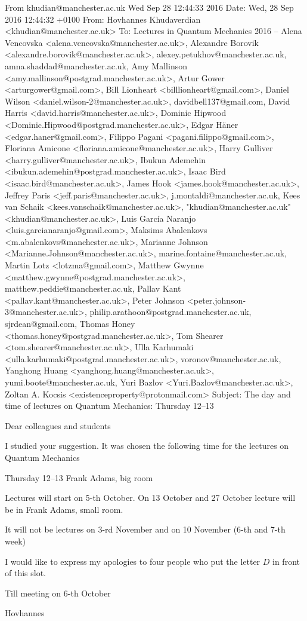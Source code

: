 From khudian@manchester.ac.uk Wed Sep 28 12:44:33 2016
Date: Wed, 28 Sep 2016 12:44:32 +0100
From: Hovhannes Khudaverdian <khudian@manchester.ac.uk>
To: Lectures in Quantum Mechanics 2016 -- Alena Vencovska <alena.vencovska@manchester.ac.uk>, Alexandre Borovik <alexandre.borovik@manchester.ac.uk>, alexey.petukhov@manchester.ac.uk, amna.shaddad@manchester.ac.uk, Amy Mallinson <amy.mallinson@postgrad.manchester.ac.uk>, Artur Gower <arturgower@gmail.com>, Bill Lionheart <billlionheart@gmail.com>, Daniel Wilson <daniel.wilson-2@manchester.ac.uk>, davidbell137@gmail.com, David Harris <david.harris@manchester.ac.uk>, Dominic Hipwood <Dominic.Hipwood@postgrad.manchester.ac.uk>, Edgar Häner <edgar.haner@gmail.com>, Filippo Pagani <pagani.filippo@gmail.com>, Floriana Amicone <floriana.amicone@manchester.ac.uk>, Harry Gulliver <harry.gulliver@manchester.ac.uk>, Ibukun Ademehin <ibukun.ademehin@postgrad.manchester.ac.uk>, Isaac Bird <isaac.bird@manchester.ac.uk>, James Hook <james.hook@manchester.ac.uk>, Jeffrey Paris <jeff.paris@manchester.ac.uk>, j.montaldi@manchester.ac.uk, Kees van Schaik <kees.vanschaik@manchester.ac.uk>, "khudian@manchester.ac.uk" <khudian@manchester.ac.uk>, Luis García Naranjo <luis.garcianaranjo@gmail.com>, Maksims Abalenkovs <m.abalenkovs@manchester.ac.uk>, Marianne Johnson <Marianne.Johnson@manchester.ac.uk>, marine.fontaine@manchester.ac.uk, Martin Lotz <lotzma@gmail.com>, Matthew Gwynne <matthew.gwynne@postgrad.manchester.ac.uk>, matthew.peddie@manchester.ac.uk, Pallav Kant <pallav.kant@manchester.ac.uk>, Peter Johnson <peter.johnson-3@manchester.ac.uk>, philip.arathoon@postgrad.manchester.ac.uk, sjrdean@gmail.com, Thomas Honey <thomas.honey@postgrad.manchester.ac.uk>, Tom Shearer <tom.shearer@manchester.ac.uk>, Ulla Karhumaki <ulla.karhumaki@postgrad.manchester.ac.uk>, voronov@manchester.ac.uk, Yanghong Huang <yanghong.huang@manchester.ac.uk>, yumi.boote@manchester.ac.uk, Yuri Bazlov <Yuri.Bazlov@manchester.ac.uk>, Zoltan A. Kocsis <existenceproperty@protonmail.com>
Subject: The day and time of lectures on Quantum Mechanics: Thursday 12--13


         Dear colleagues and students

         I studied your suggestion.
   It was chosen the following time for the lectures
     on Quantum Mechanics

     Thursday 12--13    Frank Adams, big room

    Lectures will start on 5-th October.
    On 13 October and 27 October lecture will be
     in Frank Adams, small room.

    It will not be lectures on 3-rd November
   and on 10 November (6-th and 7-th week)

    I would like to express my apologies to
     four people who put the letter
     $D$ in front of this slot.



          Till meeting on 6-th October



                   Hovhannes



